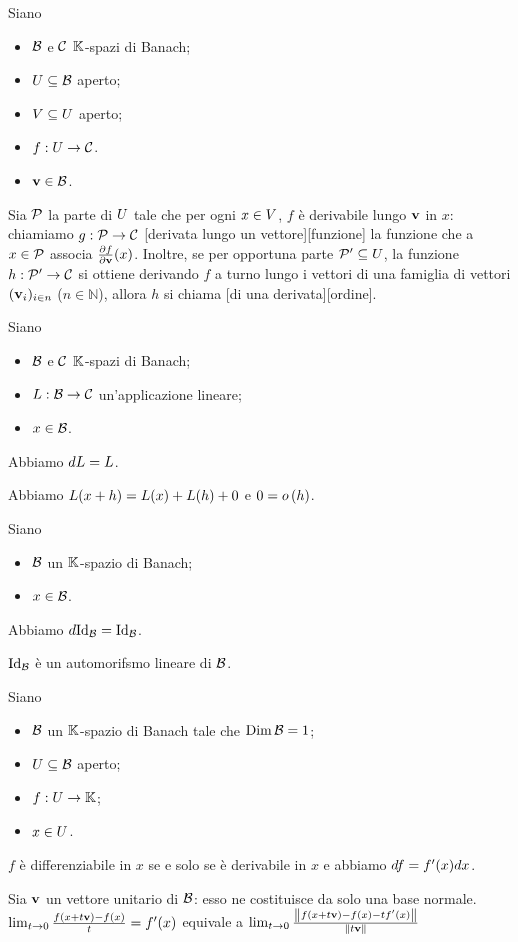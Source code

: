\begin{Definition}
	Siano
	\begin{itemize}
		\item $\mathcal{B}$ e $\mathcal{C}$ $\mathbb{K}$-spazi di Banach;
		\item $U \subseteq \mathcal{B}$ aperto;
		\item $V \subseteq U$ aperto;
		\item $f: U \rightarrow \mathcal{C}$.
		\item $\mathbf{v} \in \mathcal{B}$.
	\end{itemize}
	Sia $\mathcal{P}$ la parte di $U$ tale che per ogni $x \in V$, $f$ \`e derivabile lungo $\mathbf{v}$ in $x$: chiamiamo $g: \mathcal{P} \rightarrow \mathcal{C}$ [derivata lungo un vettore][funzione] la funzione che a $x \in \mathcal{P}$ associa $\frac{\partial f}{\partial \mathbf{v}}(x)$. Inoltre, se per opportuna parte $\mathcal{P}' \subseteq U$, la funzione $h: \mathcal{P}' \rightarrow \mathcal{C}$ si ottiene derivando $f$ a turno lungo i vettori di una famiglia di vettori $(\mathbf{v}_i)_{i \in n}$ ($n \in \mathbb{N}$), allora $h$ si chiama [di una derivata][ordine].
\end{Definition}
\begin{Theorem}
	Siano
	\begin{itemize}
		\item $\mathcal{B}$ e $\mathcal{C}$ $\mathbb{K}$-spazi di Banach;
		\item $L: \mathcal{B} \rightarrow \mathcal{C}$ un'applicazione lineare;
		\item $x \in \mathcal{B}$.
	\end{itemize}
	Abbiamo $\TotalDifferential{\Linear} = \Linear$.
\end{Theorem}
\Proof Abbiamo $L(x + h) = L(x) + L(h) + 0$ e $0 = o \left ( h \right )$. \EndProof
\begin{Corollary}
	Siano
	\begin{itemize}
		\item $\mathcal{B}$ un $\mathbb{K}$-spazio di Banach;
		\item $x \in \mathcal{B}$.
	\end{itemize}
	Abbiamo $\TotalDifferential{\Identity[\BanachSpace]} = \Identity[\BanachSpace]$.
\end{Corollary}
\Proof $\Identity[\BanachSpace]$ \`e un automorifsmo lineare di $\mathcal{B}$. \EndProof
\begin{Theorem}
	Siano
	\begin{itemize}
		\item $\mathcal{B}$ un $\mathbb{K}$-spazio di Banach tale che $\operatorname{\operatorname{Dim}}{\mathcal{B}} = 1$;
		\item $U \subseteq \mathcal{B}$ aperto;
		\item $f: U \rightarrow \mathbb{K}$;
		\item $x \in U$.
	\end{itemize}
	$f$ \`e differenziabile in $x$ se e solo se \`e derivabile in $x$ e abbiamo $\Differential{f} = \Derivative{f}(x) \Differential{x}$.
\end{Theorem}
\Proof Sia $\mathbf{v}$ un vettore unitario di $\mathcal{B}$: esso ne costituisce da solo una base normale. $\lim_{t \rightarrow 0} \frac{f(x + t\mathbf{v}) - f(x)}{t} = f'(x)$ equivale a $\lim_{t \rightarrow 0} \frac{\Norm{f(x + t\Vector) - f(x) - t f'(x)}}{\Norm{t\Vector}}$
